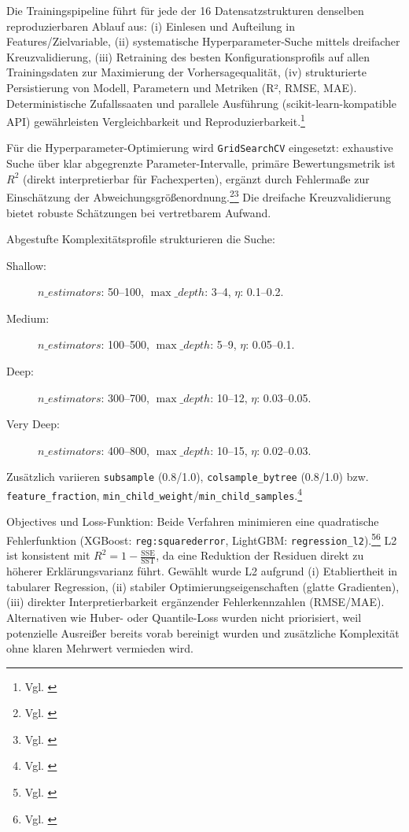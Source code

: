Die Trainingspipeline führt für jede der 16 Datensatzstrukturen denselben reproduzierbaren Ablauf aus: (i) Einlesen und Aufteilung in Features/Zielvariable, (ii) systematische Hyperparameter-Suche mittels dreifacher Kreuzvalidierung, (iii) Retraining des besten Konfigurationsprofils auf allen Trainingsdaten zur Maximierung der Vorhersagequalität, (iv) strukturierte Persistierung von Modell, Parametern und Metriken (R², RMSE, MAE). Deterministische Zufallssaaten und parallele Ausführung (scikit-learn-kompatible API) gewährleisten Vergleichbarkeit und Reproduzierbarkeit.\footnote{Vgl. \cite{Pedregosa2011ScikitLearn}}

Für die Hyperparameter-Optimierung wird \texttt{GridSearchCV} eingesetzt: exhaustive Suche über klar abgegrenzte Parameter-Intervalle, primäre Bewertungsmetrik ist $R^2$ (direkt interpretierbar für Fachexperten), ergänzt durch Fehlermaße zur Einschätzung der Abweichungsgrößenordnung.\footnote{Vgl. \cite{Bengio2012GridSearch}}\footnote{Vgl. \cite{Pedregosa2011ScikitLearn}} Die dreifache Kreuzvalidierung bietet robuste Schätzungen bei vertretbarem Aufwand.

Abgestufte Komplexitätsprofile strukturieren die Suche:
\begin{description}
  \item[Shallow:] $n\_estimators$: 50–100, $\max\_depth$: 3–4, $\eta$: 0.1–0.2.
  \item[Medium:] $n\_estimators$: 100–500, $\max\_depth$: 5–9, $\eta$: 0.05–0.1.
  \item[Deep:] $n\_estimators$: 300–700, $\max\_depth$: 10–12, $\eta$: 0.03–0.05.
  \item[Very Deep:] $n\_estimators$: 400–800, $\max\_depth$: 10–15, $\eta$: 0.02–0.03.
\end{description}
Zusätzlich variieren \texttt{subsample} (0.8/1.0), \texttt{colsample\_bytree} (0.8/1.0) bzw. \texttt{feature\_fraction}, \texttt{min\_child\_weight}/\texttt{min\_child\_samples}.\footnote{Vgl. \cite{Ke2017LightGBM}}

Objectives und Loss-Funktion: Beide Verfahren minimieren eine quadratische Fehlerfunktion (XGBoost: \texttt{reg:squarederror}, LightGBM: \texttt{regression\_l2}).\footnote{Vgl. \cite{Chen2016XGBoost}}\footnote{Vgl. \cite{Ke2017LightGBM}} L2 ist konsistent mit $R^2 = 1 - \tfrac{\text{SSE}}{\text{SST}}$, da eine Reduktion der Residuen direkt zu höherer Erklärungsvarianz führt. Gewählt wurde L2 aufgrund (i) Etabliertheit in tabularer Regression, (ii) stabiler Optimierungseigenschaften (glatte Gradienten), (iii) direkter Interpretierbarkeit ergänzender Fehlerkennzahlen (RMSE/MAE). Alternativen wie Huber- oder Quantile-Loss wurden nicht priorisiert, weil potenzielle Ausreißer bereits vorab bereinigt wurden und zusätzliche Komplexität ohne klaren Mehrwert vermieden wird.

